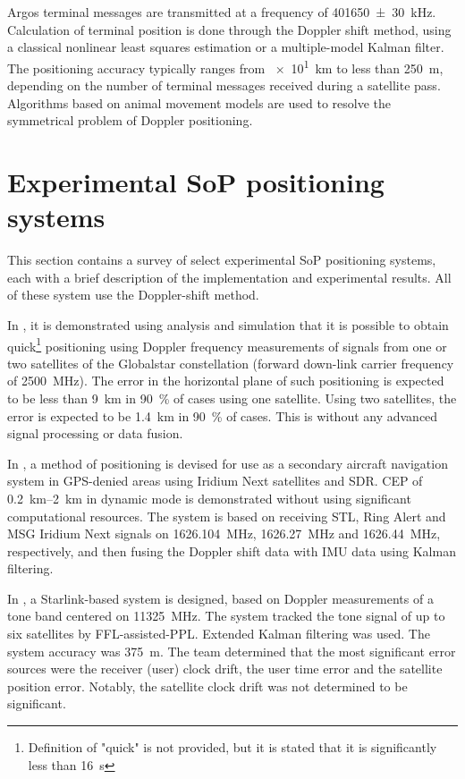 Argos terminal messages are transmitted at a frequency of \qty{401650(30)}{kHz}. Calculation of terminal position is done through the Doppler shift method, using a classical nonlinear least squares estimation or a multiple-model Kalman filter. The positioning accuracy typically ranges from \qty{e1}{km} to less than \qty{250}{m}, depending on the number of terminal messages received during a satellite pass\cite{sop09}. Algorithms based on animal movement models are used to resolve the symmetrical problem of Doppler positioning\cite{sat17}.


\section{Experimental SoP positioning systems}
This section contains a survey of select experimental SoP positioning systems, each with a brief description of the implementation and experimental results. All of these system use the Doppler-shift method.

In \cite{sop07}, it is demonstrated using analysis and simulation that it is possible to obtain quick\footnote{Definition of "quick" is not provided, but it is stated that it is significantly less than \qty{16}{\s}} positioning using Doppler frequency measurements of signals from one or two satellites of the Globalstar constellation (forward down-link carrier frequency of \qty{2500}{\mega\hertz}). The error in the horizontal plane of such positioning is expected to be less than \qty{9}{\km} in \qty{90}{\percent} of cases using one satellite. Using two satellites, the error is expected to be \qty{1.4}{\km} in \qty{90}{\percent} of cases. This is without any advanced signal processing or data fusion.

In \cite{sop01}, a method of positioning is devised for use as a secondary aircraft navigation system in GPS-denied areas using Iridium Next satellites and SDR. CEP of \qtyrange{0.2}{2}{\km} in dynamic mode is demonstrated without using significant computational resources. The system is based on receiving STL, Ring Alert and MSG Iridium Next signals on \qty{1626.104}{\mega\hertz}, \qty{1626.27}{\mega\hertz} and \qty{1626.44}{\mega\hertz}, respectively, and then fusing the Doppler shift data with IMU data using Kalman filtering.

In \cite{sop04}, a Starlink-based system is designed, based on Doppler measurements of a tone band centered on \qty{11 325}{\mega\hertz}. The system tracked the tone signal of up to six satellites by FFL-assisted-PPL. Extended Kalman filtering was used. The system accuracy was \qty{375}{\metre}. The team determined that the most significant error sources were the receiver (user) clock drift, the user time error and the satellite position error. Notably, the satellite clock drift was not determined to be significant.

